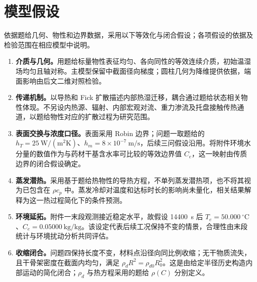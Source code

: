 \par\vspace{0.5\baselineskip}
\section{模型假设}

依据题给几何、物性和边界数据，采用以下等效化与闭合假设；各项假设的依据及检验范围在相应模型中说明。

\begin{enumerate}
  \item \textbf{介质与几何。}用题给标量物性表征均匀、各向同性的等效连续介质，初始温湿场均匀且轴对称。主模型保留中截面径向梯度；圆柱几何为降维提供依据，端面影响由后文二维对照检验。
  \item \textbf{传递机制。}以导热和 Fick 扩散描述内部热湿迁移，耦合通过题给状态相关物性体现。不另设内热源、辐射、内部宏观对流、重力渗流及托盘接触传热通道，以题给物性对应的扩散过程为研究范围。
  \item \textbf{表面交换与浓度口径。}表面采用 Robin 边界；问题一取题给的 $h_T=25~\mathrm{W/(m^2K)}$、$h_m=8\times10^{-7}~\mathrm{m/s}$，后续三问假设沿用。将附件环境水分量的数值作为与药材干基含水率可比较的等效边界值 $C_e$，这一映射由传质边界的闭合假设确定。
  \item \textbf{蒸发潜热。}采用基于题给热物性的导热方程，不单列蒸发潜热项，也不将其视为已包含在 $\rho c_p$ 中。蒸发冷却对温度和达标时长的影响尚未量化，相关结果解释为这一热过程简化下的条件预测。
  \item \textbf{环境延拓。}附件一末段观测接近稳定水平，故假设 14400~s 后 $T_e=50.000~{}^\circ\mathrm C$、$C_e=0.05000~\mathrm{kg/kg}$。该设定代表后续工况保持不变的情景，合理性由末段统计与环境扰动分析共同评估。
  \item \textbf{收缩闭合。}问题四保持长度不变，材料点沿径向同比例收缩；无干物质流失，且干骨架密度在截面内均匀，满足 $\rho_dR^2=\rho_{d0}R_0^2$。这是由给定半径历史构造内部运动的简化闭合；$\rho_d$ 与热方程采用的题给 $\rho(C)$ 分别定义。
\end{enumerate}

